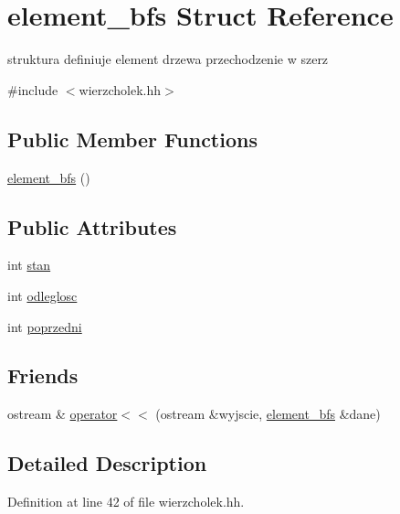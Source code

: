 \hypertarget{structelement__bfs}{\section{element\-\_\-bfs \-Struct \-Reference}
\label{structelement__bfs}
}


struktura definiuje element drzewa przechodzenie w szerz  




{\ttfamily \#include $<$wierzcholek.\-hh$>$}

\subsection*{\-Public \-Member \-Functions}
\begin{DoxyCompactItemize}
\item 
\hyperlink{structelement__bfs_a9c764ce268e74260e6634ea98ed13781}{element\-\_\-bfs} ()
\end{DoxyCompactItemize}
\subsection*{\-Public \-Attributes}
\begin{DoxyCompactItemize}
\item 
int \hyperlink{structelement__bfs_aa654df64808f513f41d0349571e4b90e}{stan}
\item 
int \hyperlink{structelement__bfs_a91fcdfed5d5dc2bce6ca9bb4414df196}{odleglosc}
\item 
int \hyperlink{structelement__bfs_a94b882f6922be485d6942f71c29e581d}{poprzedni}
\end{DoxyCompactItemize}
\subsection*{\-Friends}
\begin{DoxyCompactItemize}
\item 
ostream \& \hyperlink{structelement__bfs_a8b076b347dc8398fd7e704d74299eb3a}{operator$<$$<$} (ostream \&wyjscie, \hyperlink{structelement__bfs}{element\-\_\-bfs} \&dane)
\end{DoxyCompactItemize}


\subsection{\-Detailed \-Description}


\-Definition at line 42 of file wierzcholek.\-hh.



